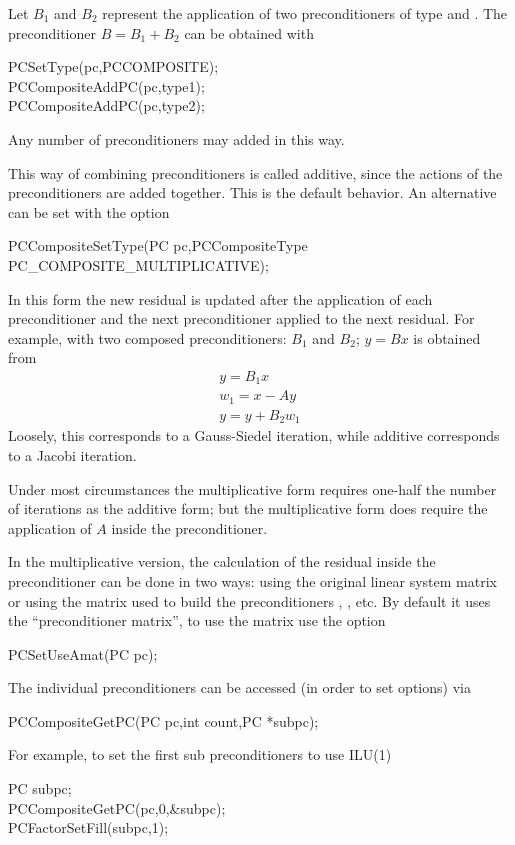 Let $B_1$ and $B_2$ represent the application of two
preconditioners of type  and . The preconditioner
$ B = B_1 + B_2 $ can be obtained with
\begin{tabbing}
  PCSetType(pc,PCCOMPOSITE);\\
  PCCompositeAddPC(pc,type1);\\
  PCCompositeAddPC(pc,type2);
\end{tabbing}
Any number of preconditioners may added in this way.

This way of combining preconditioners is called additive, since
the actions of the preconditioners are added together. This is the
default behavior. An alternative can be set with the option
\begin{tabbing}
  PCCompositeSetType(PC pc,PCCompositeType PC\_COMPOSITE\_MULTIPLICATIVE);
\end{tabbing}
 
In this form the new residual is updated after the application of
each preconditioner and the next preconditioner applied to the next
residual. For example, with two composed preconditioners: $B_1$ and
$ B_2$; $ y = B x $ is obtained from
\begin{eqnarray*}
  y    = B_1 x \\
  w_1  = x - A y \\
  y    = y + B_2 w_1
\end{eqnarray*}
Loosely, this corresponds to a Gauss-Siedel iteration, while
additive corresponds to a Jacobi iteration.

Under most circumstances the multiplicative form requires one-half the number of
iterations as the additive form; but the multiplicative form does require
the application of $ A $ inside the preconditioner.

In the multiplicative version, the calculation of the residual inside the
preconditioner can be done in two ways: using the original linear system matrix
or using the matrix used to build the preconditioners , , etc.
By default it uses the ``preconditioner matrix'', to use the  matrix use the
option
\begin{tabbing}
  PCSetUseAmat(PC pc);
\end{tabbing}

The individual
preconditioners can be accessed (in order to set options) via
\begin{tabbing}
  PCCompositeGetPC(PC pc,int count,PC *subpc);
\end{tabbing}
For example, to set the first sub preconditioners to use ILU(1)
\begin{tabbing}
   PC subpc;\\
  PCCompositeGetPC(pc,0,\&subpc);\\
  PCFactorSetFill(subpc,1);
\end{tabbing}

